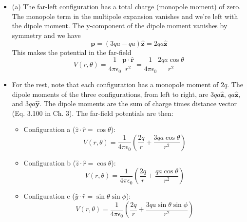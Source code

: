 \documentclass[10pt]{article}
\begin{document}
\begin{enumerate}
\begin{itemize}
\item (a) The far-left configuration has a total charge (monopole moment) of zero.  The monopole term in the multipole expansion vanishes and we're left with the dipole moment.  The y-component of the dipole moment vanishes by symmetry and we have
\begin{equation}
\mathbf{p} = (3qa - qa)\hat{\mathbf{z}} = 2qa\hat{\mathbf{z}}
\end{equation}
This makes the potential in the far-field
\begin{equation}
V(r,\theta) = \frac{1}{4\pi\epsilon_0}\frac{\mathbf{p} \cdot \hat{\mathbf{r}}}{r^2} = \frac{1}{4\pi\epsilon_0}\frac{2qa\cos\theta}{r^2}
\end{equation}
\item For the rest, note that each configuration has a monopole moment of $2q$.  The dipole moments of the three configurations, from left to right, are $3qa\hat{\mathbf{z}}$, $qa\hat{\mathbf{z}}$, and $3qa\hat{\mathbf{y}}$.  The dipole moments are the sum of charge times distance vector (Eq. 3.100 in Ch. 3).  The far-field potentials are then:
\begin{itemize}
\item Configuration a ($\hat{z} \cdot \hat{r} = \cos\theta$):
\begin{equation}
V(r,\theta) = \frac{1}{4\pi\epsilon_0}\left( \frac{2q}{r} + \frac{3qa\cos\theta}{r^2}\right)
\end{equation}
\item Configuration b ($\hat{z} \cdot \hat{r} = \cos\theta$):
\begin{equation}
V(r,\theta) = \frac{1}{4\pi\epsilon_0}\left( \frac{2q}{r} + \frac{qa\cos\theta}{r^2}\right)
\end{equation}
\item Configuration c ($\hat{y} \cdot \hat{r} = \sin\theta\sin\phi$):
\begin{equation}
V(r,\theta) = \frac{1}{4\pi\epsilon_0}\left( \frac{2q}{r} + \frac{3qa\sin\theta\sin\phi}{r^2}\right)
\end{equation}
\end{itemize}
\end{itemize}

\end{enumerate}
\end{document}
